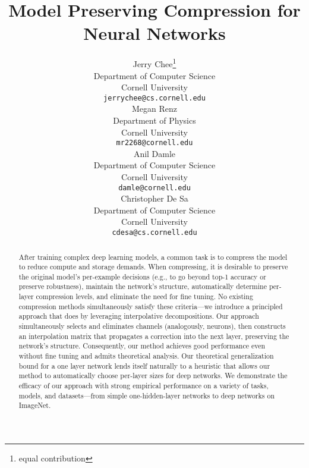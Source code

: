 \documentclass{article}
\title{
Model Preserving Compression for Neural Networks
}
\author{%
}
\author{
  Jerry Chee\thanks{equal contribution} \\
  Department of Computer Science\\
  Cornell University\\
  \texttt{jerrychee@cs.cornell.edu}\\
   \And
   Megan Renz\footnotemark[1]\\
   Department of Physics\\
   Cornell University \\
   \texttt{mr2268@cornell.edu}\\
   \AND
   Anil Damle \\
   Department of Computer Science\\
   Cornell University \\
   \texttt{damle@cornell.edu}\\
   \And
   Christopher De Sa \\
   Department of Computer Science\\
   Cornell University \\
   \texttt{cdesa@cs.cornell.edu}
}
\begin{document}
\maketitle


\begin{abstract}
After training complex deep learning models, a common task is to compress the model to reduce compute and storage demands. When compressing, it is desirable to preserve the original model's per-example decisions (e.g., to go beyond top-1 accuracy or preserve robustness), maintain the network's structure, automatically determine per-layer compression levels, and eliminate the need for fine tuning. No existing compression methods simultaneously satisfy these criteria---we introduce a principled approach that does by leveraging interpolative decompositions. Our approach simultaneously selects and eliminates channels 
(analogously, neurons), then constructs an interpolation matrix that propagates a correction into the next layer, preserving the network's structure. 
Consequently, our method achieves good performance even without fine tuning and admits theoretical analysis.
Our theoretical generalization bound for a one layer network lends itself naturally to a heuristic that allows our method to automatically choose per-layer sizes for deep networks.
We demonstrate the efficacy of our approach with strong empirical performance on a variety of tasks, models, and datasets---from simple one-hidden-layer networks to deep networks on ImageNet.


\end{abstract}
\end{document}
